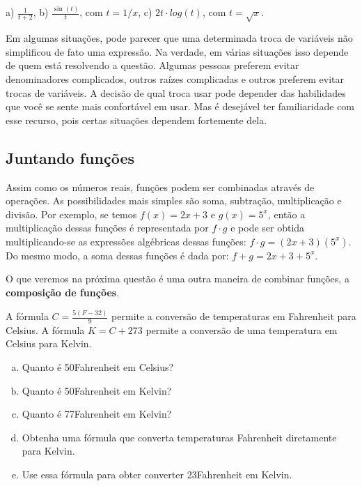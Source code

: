 \documentclass[main.tex]{subfiles}
\begin{document}
\begin{gabarito}
	\begin{gabaritoQuestao}
		a) $\frac{1}{t+2}$, b) $\frac{\sin(t)}{t}$, com $t=1/x$, c) $2t \cdot log(t)$, com $t=\sqrt{x}$.
	\end{gabaritoQuestao}
\end{gabarito}

Em algumas situações, pode parecer que uma determinada troca de variáveis não simplificou de fato uma expressão. Na verdade, em várias situações isso depende de quem está resolvendo a questão. Algumas pessoas preferem evitar denominadores complicados, outros raízes complicadas e outros preferem evitar trocas de variáveis. A decisão de qual troca usar pode depender das habilidades que você se sente mais confortável em usar. Mas é desejável ter familiaridade com esse recurso, pois certas situações dependem fortemente dela.

\subsection*{Juntando funções}

Assim como os números reais, funções podem ser combinadas através de operações. As possibilidades mais simples são soma, subtração, multiplicação e divisão. Por exemplo, se temos $f(x)=2x+3$ e $g(x)=5^x$, então a multiplicação dessas funções é representada por $f \cdot g$ e pode ser obtida multiplicando-se as expressões algébricas dessas funções: $f \cdot g = (2x+3)(5^x)$. Do mesmo modo, a soma dessas funções é dada por: $f+g = 2x+3+5^x$.

O que veremos na próxima questão é uma outra maneira de combinar funções, a \textbf{composição de funções}.

\begin{questao}
A fórmula $C=\frac{5(F-32)}{9}$ permite a conversão de temperaturas em Fahrenheit para Celsius. A fórmula $K=C+273$ permite a conversão de uma temperatura em Celsius para Kelvin.
\begin{enumerate}[a)]
\item Quanto é 50\degree Fahrenheit em Celsius?
\item Quanto é 50\degree Fahrenheit em Kelvin?
\item Quanto é 77\degree Fahrenheit em Kelvin?
\item Obtenha uma fórmula que converta temperaturas Fahrenheit diretamente para Kelvin.
\item Use essa fórmula para obter converter 23\degree Fahrenheit em Kelvin.
\end{enumerate}
\end{questao}
\end{document}
